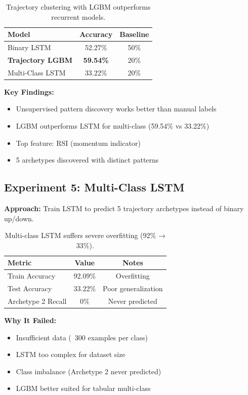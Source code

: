 \documentclass[10pt,twocolumn]{article}
\begin{document}
\begin{table}[h]
\centering
\small
\begin{tabular}{lcc}
\toprule
Model & Accuracy & Baseline \\
\midrule
Binary LSTM & 52.27\% & 50\% \\
\textbf{Trajectory LGBM} & \textbf{59.54\%} & 20\% \\
Multi-Class LSTM & 33.22\% & 20\% \\
\bottomrule
\end{tabular}
\caption{Trajectory clustering with LGBM outperforms recurrent models.}
\end{table}

\textbf{Key Findings:}
\begin{itemize}
\item Unsupervised pattern discovery works better than manual labels
\item LGBM outperforms LSTM for multi-class (59.54\% vs 33.22\%)
\item Top feature: RSI (momentum indicator)
\item 5 archetypes discovered with distinct patterns
\end{itemize}

\subsection{Experiment 5: Multi-Class LSTM}

\textbf{Approach:} Train LSTM to predict 5 trajectory archetypes instead of binary up/down.

\begin{table}[h]
\centering
\small
\begin{tabular}{lcc}
\toprule
Metric & Value & Notes \\
\midrule
Train Accuracy & 92.09\% & Overfitting \\
Test Accuracy & 33.22\% & Poor generalization \\
Archetype 2 Recall & 0\% & Never predicted \\
\bottomrule
\end{tabular}
\caption{Multi-class LSTM suffers severe overfitting (92\% → 33\%).}
\end{table}

\textbf{Why It Failed:}
\begin{itemize}
\item Insufficient data (~300 examples per class)
\item LSTM too complex for dataset size
\item Class imbalance (Archetype 2 never predicted)
\item LGBM better suited for tabular multi-class
\end{itemize}
\end{document}
